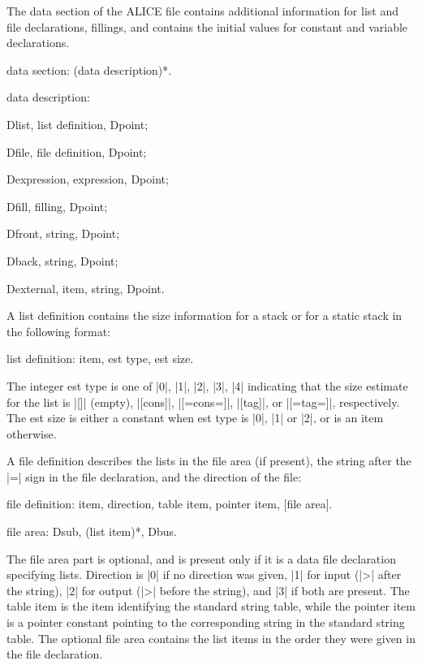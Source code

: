 \documentclass[titlepage]{article}
\newcommand\I{\textsf{ALICE}}
\newenvironment{grammar}{%
\begin{list}{}{%
\setlength\leftmargin{18pt}%
\setlength\rightmargin{-5pt}%
\setlength\listparindent{20pt}%
\setlength\itemsep{1pt plus0.2ex}%
\setlength\parsep{0pt plus 2pt}%
\setlength\labelsep{-5pt}%
}\color{blue!90!black}\sf\mkoptions%
}{\end{list}}
\newcommand\g[1]{\textsf{\color{blue!90!black}#1}}
\begin{document}
The \g{data section} of the \I{} file contains additional information for 
list and file declarations, fillings, and contains the initial values for 
\g{constant} and \g{variable} declarations. 
\begin{grammar}
\item data section: (data description)*.
\item data description:

            Dlist, list definition, Dpoint;

            Dfile, file definition, Dpoint;

            Dexpression, expression, Dpoint;

            Dfill, filling, Dpoint;

            Dfront, string, Dpoint;

            Dback, string, Dpoint;

            Dexternal, item, string, Dpoint.
\end{grammar}
A \g{list definition} contains the size information for a stack or for a
static stack in the following format:
\begin{grammar}
\item list definition: item, est type, est size.
\end{grammar}
The integer \g{est type} is one of \pp|0|, \pp|1|, \pp|2|, \pp|3|, \pp|4|
indicating that the size estimate for the list is \pp|[]| (empty),
\pp|[cons]|, \pp|[=cons=]|, \pp|[tag]|, or \pp|[=tag=]|, respectively. The
\g{est size} is either a constant when \g{est type} is \pp|0|, \pp|1| or
\pp|2|, or is an \g{item} otherwise.

A \g{file definition} describes the lists in the file area (if present),
the string after the \pp|=| sign in the file declaration, and the direction
of the file:
\begin{grammar}
\item file definition: item, direction, table item, pointer item, [file
area].

\item file area: Dsub, (list item)*, Dbus.
\end{grammar}
The \g{file area} part is optional, and is present only if it is a data file
declaration specifying lists. \g{Direction} is \pp|0| if no direction was
given, \pp|1| for input (\pp|>| after the string), \pp|2| for output (\pp|>|
before the string), and \pp|3| if both are present. The \g{table item} is the item identifying the standard
string table, while the \g{pointer item} is a pointer constant pointing to the
corresponding string in the standard string table. The optional \g{file
area} contains the list items in the order they were given in the file
declaration.
\end{document}
